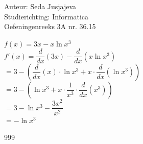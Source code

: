 \documentclass[a4paper]{article}
\begin{document}
\noindent \large Auteur: Seda Jusjajeva\\
\noindent \large Studierichting: Informatica\\
\noindent \large Oefeningenreeks 3A nr. 36.15 \\

\medskip

\normalsize


$f(x) = 3x - x\ln x^3$ \\

$f'(x) = \dfrac{d}{dx}(3x) - \dfrac{d}{dx}(x\ln x^3)$ \\

$= 3 - \left(\dfrac{d}{dx}(x)\cdot\ln x^3 + x\cdot\dfrac{d}{dx}(\ln x^3)\right)$ \\

$= 3 - \left(\ln x^3 + x\cdot\dfrac{1}{x^3}\cdot\dfrac{d}{dx}(x^3)\right)$ \\

$= 3 - \ln x^3 - \dfrac{3x^2}{x^2}$ \\

$= -\ln x^3$ \\




\begin{thebibliography}{999}
\end{thebibliography}
\end{document}

